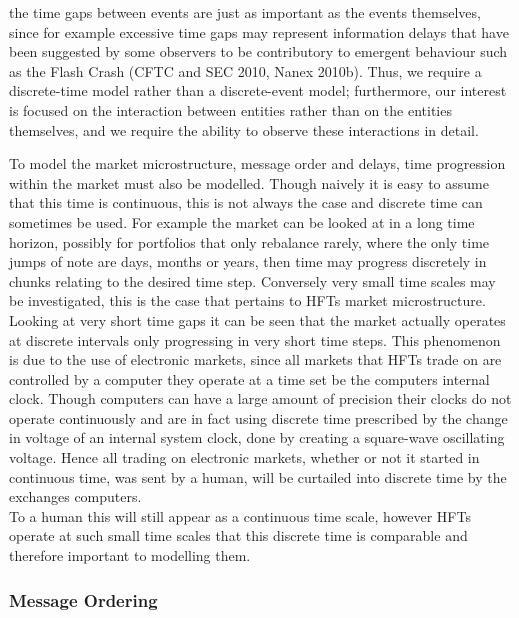 \documentclass{article}
\begin{document}
the time gaps between events are just as important as the events themselves, since for example excessive time gaps may represent information delays that have been suggested by some observers to be contributory to emergent behaviour such as the Flash Crash (CFTC and SEC 2010, Nanex 2010b).  Thus, we require a discrete-time model rather than a discrete-event model; furthermore, our interest is focused on the interaction between entities rather than on the entities themselves, and we require the ability to observe these interactions in detail.  

To model the market microstructure, message order and delays, time progression within the market must also be modelled. Though naively it is easy to assume that this time is continuous, this is not always the case and discrete time can sometimes be used. For example the market can be looked at in a long time horizon,  possibly for portfolios that only rebalance rarely, where the only time jumps of note are days, months or years, then time may progress discretely in chunks relating to the desired time step. Conversely very small time scales may be investigated, this is the case that pertains to HFTs market microstructure. Looking at very short time gaps it can be seen that the market actually operates at discrete intervals only progressing in very short time steps. This phenomenon is due to the use of electronic markets, since all markets that HFTs trade on are controlled by a computer they operate at a time set be the computers internal clock. Though computers can have a large amount of precision their clocks do not operate continuously and are in fact using discrete time prescribed by the change in voltage of an internal system clock, done by creating a square-wave oscillating voltage. Hence all trading on electronic markets, whether or not it started in continuous time, was sent by a human, will be curtailed into discrete time by the exchanges computers.\\
To a human this will still appear as a continuous time scale, however HFTs operate at such small time scales that this discrete time is comparable and therefore important to modelling them.       

\subsubsection{Message Ordering}
\end{document}
